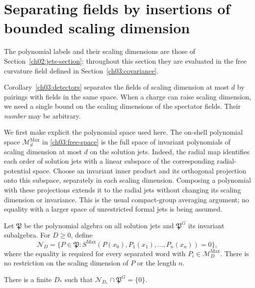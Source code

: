 \section{Separating fields by insertions of bounded scaling dimension}\label{ch03:bounded-detector}

The polynomial labels and their scaling dimensions are those of Section~\ref{ch02:jets-section}; throughout this section they are evaluated in the free curvature field defined in Section~\ref{ch03:covariance}.

Corollary~\ref{ch03:detectors} separates the fields of scaling dimension
at most $d$ by pairings with fields in the same space. When a charge
can raise scaling dimension, we need a single bound on the scaling
dimensions of the spectator fields. Their \emph{number} may be arbitrary.

We first make explicit the polynomial space used here. The on-shell polynomial space
$\mathcal M_d^{\mathrm{Max}}$ in \eqref{ch03:free-space} is the full
space of invariant polynomials of scaling dimension at most $d$ on the solution
jets. Indeed, the radial map identifies each order of solution jets with
a linear subspace of the corresponding radial-potential space.
Choose an invariant inner product and its orthogonal projection onto
this subspace, separately in each scaling dimension. Composing a polynomial with
these projections extends it to the radial jets without changing its
scaling dimension or invariance. This is the usual compact-group averaging
argument; no equality with a larger space of unrestricted formal jets
is being assumed.

Let $\mathfrak P$ be the polynomial algebra on all solution jets and
$\mathfrak P^G$ its invariant subalgebra. For $D\ge0$, define
\begin{equation}\label{ch03:ND}
 \mathcal N_D=\{P\in\mathfrak P:
 S^{\mathrm{Max}}(P(x_0),P_1(x_1),\ldots,P_n(x_n))=0\},
\end{equation}
where the equality is required for every separated word with
$P_i\in\mathcal M_D^{\mathrm{Max}}$. There is no restriction on
the scaling dimension of $P$ or the length $n$.

\begin{proposition}
\label{ch03:uniform-detector}
There is a finite $D_*$ such that
$\mathcal N_{D_*}\cap\mathfrak P^G=\{0\}$.
\end{proposition}


